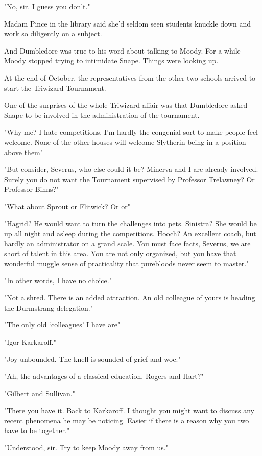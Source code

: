 "No, sir. I guess you don't."

Madam Pince in the library said she'd seldom seen students knuckle down and work so diligently on a subject.

And Dumbledore was true to his word about talking to Moody. For a while Moody stopped trying to intimidate Snape. Things were looking up.

At the end of October, the representatives from the other two schools arrived to start the Triwizard Tournament.

One of the surprises of the whole Triwizard affair was that Dumbledore asked Snape to be involved in the administration of the tournament.

"Why me? I hate competitions. I'm hardly the congenial sort to make people feel welcome. None of the other houses will welcome Slytherin being in a position above them{\el}"

"But consider, Severus, who else could it be? Minerva and I are already involved. Surely you do not want the Tournament supervised by Professor Trelawney? Or Professor Binns?"

"What about Sprout or Flitwick? Or{\el} or{\el}"

"Hagrid? He would want to turn the challenges into pets. Sinistra? She would be up all night and asleep during the competitions. Hooch? An excellent coach, but hardly an administrator on a grand scale. You must face facts, Severus, we are short of talent in this area. You are not only organized, but you have that wonderful muggle sense of practicality that purebloods never seem to master."

"In other words, I have no choice."

"Not a shred. There is an added attraction. An old{\el} colleague of yours is heading the Durmstrang delegation."

"The only old `colleagues' I have are{\el}"

"Igor Karkaroff."

"Joy unbounded. The knell is sounded of grief and woe."

"Ah, the advantages of a classical education. Rogers and Hart?"

"Gilbert and Sullivan."

"There you have it. Back to Karkaroff. I thought you might want to discuss any recent phenomena he may be noticing. Easier if there is a reason why you two have to be together."

"Understood, sir. Try to keep Moody away from us."

